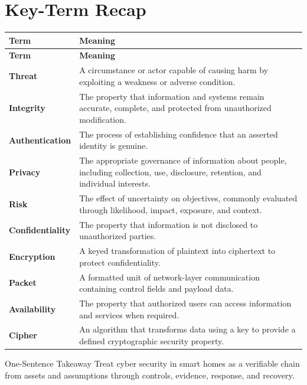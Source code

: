 \documentclass[11pt,letterpaper]{article}
\begin{document}
\section*{Key-Term Recap}
\begin{longtable}{>{\raggedright\arraybackslash}p{}>{\raggedright\arraybackslash}p{}}
\toprule\rowcolor{Navy}\color{white}\textbf{Term} & \color{white}\textbf{Meaning}\\\midrule
\endfirsthead
\toprule\rowcolor{Navy}\color{white}\textbf{Term} & \color{white}\textbf{Meaning}\\\midrule
\endhead
\textbf{Threat} & A circumstance or actor capable of causing harm by exploiting a weakness or adverse condition. \\\midrule
\textbf{Integrity} & The property that information and systems remain accurate, complete, and protected from unauthorized modification. \\\midrule
\textbf{Authentication} & The process of establishing confidence that an asserted identity is genuine. \\\midrule
\textbf{Privacy} & The appropriate governance of information about people, including collection, use, disclosure, retention, and individual interests. \\\midrule
\textbf{Risk} & The effect of uncertainty on objectives, commonly evaluated through likelihood, impact, exposure, and context. \\\midrule
\textbf{Confidentiality} & The property that information is not disclosed to unauthorized parties. \\\midrule
\textbf{Encryption} & A keyed transformation of plaintext into ciphertext to protect confidentiality. \\\midrule
\textbf{Packet} & A formatted unit of network-layer communication containing control fields and payload data. \\\midrule
\textbf{Availability} & The property that authorized users can access information and services when required. \\\midrule
\textbf{Cipher} & An algorithm that transforms data using a key to provide a defined cryptographic security property. \\\midrule
\bottomrule
\end{longtable}
\begin{CornellExamBox}{One-Sentence Takeaway}
Treat cyber security in smart homes as a verifiable chain from assets and assumptions through controls, evidence, response, and recovery.
\end{CornellExamBox}
\end{document}
